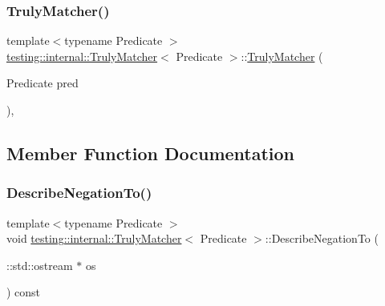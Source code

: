 \subsubsection{\texorpdfstring{Truly\+Matcher()}{TrulyMatcher()}}
{\footnotesize\ttfamily template$<$typename Predicate $>$ \\
\hyperlink{classtesting_1_1internal_1_1_truly_matcher}{testing\+::internal\+::\+Truly\+Matcher}$<$ Predicate $>$\+::\hyperlink{classtesting_1_1internal_1_1_truly_matcher}{Truly\+Matcher} (\begin{DoxyParamCaption}\item[{Predicate}]{pred }\end{DoxyParamCaption})\hspace{0.3cm}{\ttfamily [inline]}, {\ttfamily [explicit]}}



\subsection{Member Function Documentation}
\mbox{\label{classtesting_1_1internal_1_1_truly_matcher_a2e753f5d571b6a51b8ef620dcbb3a591}} 
\subsubsection{\texorpdfstring{Describe\+Negation\+To()}{DescribeNegationTo()}}
{\footnotesize\ttfamily template$<$typename Predicate $>$ \\
void \hyperlink{classtesting_1_1internal_1_1_truly_matcher}{testing\+::internal\+::\+Truly\+Matcher}$<$ Predicate $>$\+::Describe\+Negation\+To (\begin{DoxyParamCaption}\item[{\+::std\+::ostream $\ast$}]{os }\end{DoxyParamCaption}) const\hspace{0.3cm}{\ttfamily [inline]}}

\mbox{\label{classtesting_1_1internal_1_1_truly_matcher_ac327b4bd408386f489c4279e7e3f9530}} 
